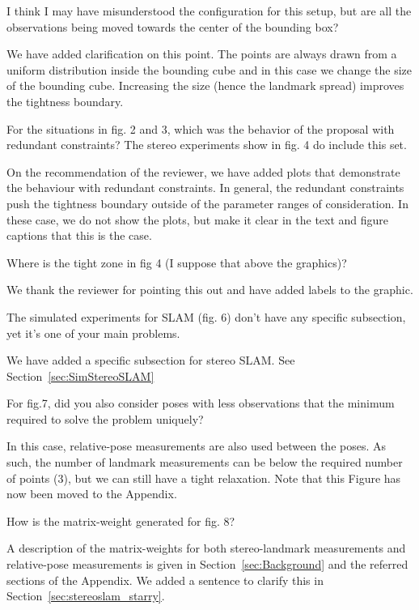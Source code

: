 I think I may have misunderstood the configuration for this setup, but are all the observations being moved towards the center of the bounding box?  
\begin{response}
    We have added clarification on this point. The points are always drawn from a uniform distribution inside the bounding cube and in this case we change the size of the bounding cube. Increasing the size (hence the landmark spread) improves the tightness boundary.
\end{response}

For the situations in fig. 2 and 3, which was the behavior of the proposal with redundant constraints? The stereo experiments show in fig. 4 do include this set. 
\begin{response}
    On the recommendation of the reviewer, we have added plots that demonstrate the behaviour with redundant constraints. In general, the redundant constraints push the tightness boundary outside of the parameter ranges of consideration. In these case, we do not show the plots, but make it clear in the text and figure captions that this is the case.
\end{response}

Where is the tight zone in fig 4 (I suppose that above the graphics)?  
\begin{response}
    We thank the reviewer for pointing this out and have added labels to the graphic.
\end{response}

The simulated experiments for SLAM (fig. 6) don’t have any specific subsection, yet it’s one of your main problems.
\begin{response}
    We have added a specific subsection for stereo SLAM. See Section~\ref{sec:SimStereoSLAM}
\end{response}

For fig.7, did you also consider poses with less observations that the minimum required to solve the problem uniquely?  
\begin{response}
    In this case, relative-pose measurements are also used between the poses. As such, the number of landmark measurements can be below the required number of points (3), but we can still have a tight relaxation. Note that this Figure has now been moved to the Appendix.
\end{response}

How is the matrix-weight generated for fig. 8? 
\begin{response}
    A description of the matrix-weights for both stereo-landmark measurements and relative-pose measurements is given in Section~\ref{sec:Background} and the referred sections of the Appendix. We added a sentence to clarify this in Section~\ref{sec:stereoslam_starry}.
\end{response}


